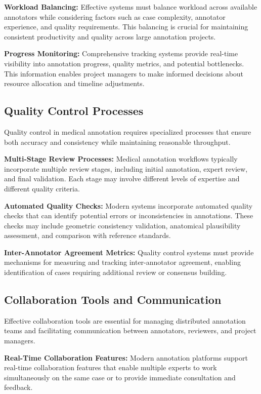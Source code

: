 \textbf{Workload Balancing:} Effective systems must balance workload across available annotators while considering factors such as case complexity, annotator experience, and quality requirements. This balancing is crucial for maintaining consistent productivity and quality across large annotation projects.

\textbf{Progress Monitoring:} Comprehensive tracking systems provide real-time visibility into annotation progress, quality metrics, and potential bottlenecks. This information enables project managers to make informed decisions about resource allocation and timeline adjustments.

\subsection{Quality Control Processes}

Quality control in medical annotation requires specialized processes that ensure both accuracy and consistency while maintaining reasonable throughput.

\textbf{Multi-Stage Review Processes:} Medical annotation workflows typically incorporate multiple review stages, including initial annotation, expert review, and final validation. Each stage may involve different levels of expertise and different quality criteria.

\textbf{Automated Quality Checks:} Modern systems incorporate automated quality checks that can identify potential errors or inconsistencies in annotations. These checks may include geometric consistency validation, anatomical plausibility assessment, and comparison with reference standards.

\textbf{Inter-Annotator Agreement Metrics:} Quality control systems must provide mechanisms for measuring and tracking inter-annotator agreement, enabling identification of cases requiring additional review or consensus building.

\subsection{Collaboration Tools and Communication}

Effective collaboration tools are essential for managing distributed annotation teams and facilitating communication between annotators, reviewers, and project managers.

\textbf{Real-Time Collaboration Features:} Modern annotation platforms support real-time collaboration features that enable multiple experts to work simultaneously on the same case or to provide immediate consultation and feedback.

